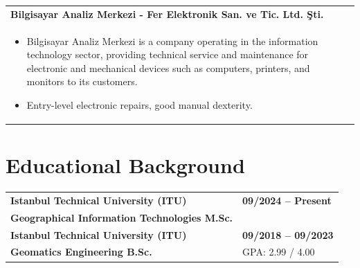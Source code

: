 \documentclass[10pt,a4paper]{article}
\begin{document}
\begin{longtable}{@{} p{} | >{\centering\arraybackslash}p{} @{}}
  \vspace{-2pt}
  \textbf{Bilgisayar Analiz Merkezi - Fer Elektronik San. ve Tic. Ltd. Şti.} & \\ [-5pt]
  \begin{itemize}
    \item Bilgisayar Analiz Merkezi is a company operating in the information technology sector, providing technical service and maintenance for electronic and mechanical devices such as computers, printers, and monitors to its customers.
    \item Entry-level electronic repairs, good manual dexterity.
  \end{itemize} & \\ [10pt]

\end{longtable}

\vspace{5pt}

\section{Educational Background}
\vspace{-15pt}

\begin{longtable}{@{} p{} | >{\centering\arraybackslash}p{} @{}}
  \textbf{Istanbul Technical University (ITU)} & \textbf{09/2024 -- Present} \\
  \vspace{-8pt}
  \quad \textbf{\color{cvblue}Geographical Information Technologies M.Sc.} & \\
  \vspace{-5pt}

  \textbf{Istanbul Technical University (ITU)} & \textbf{09/2018 -- 09/2023} \\
  \vspace{-8pt}
  \quad \textbf{\color{cvblue}Geomatics Engineering B.Sc.} & GPA: 2.99 / 4.00 \\ [10pt]


\end{longtable}
\end{document}
